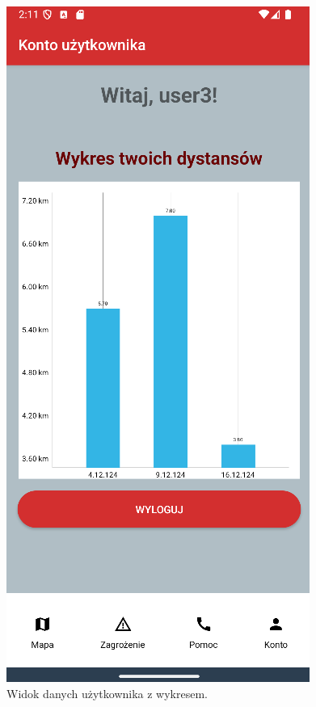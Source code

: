 \begin{figure}[H]
    \centering
    \includegraphics[scale=0.6]{img/imp/widok-user.png}
    \caption{Widok danych użytkownika z wykresem.}
    \label{widok:user}
\end{figure}

